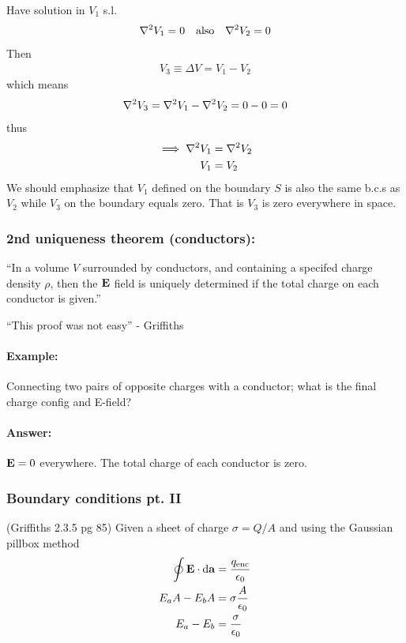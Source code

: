 \documentclass[../main.tex]{subfiles}
\begin{document}
Have solution in $V_1$ s.l.
\begin{align*}
    \laplacian V_1 = 0 \qqtext{also} \laplacian V_2 = 0
\end{align*}
Then
\begin{align*}
    V_3 \equiv \Delta V = V_1 - V_2
\end{align*}
which means
\begin{align*}
    \laplacian V_3 = \laplacian V_1 - \laplacian V_2 = 0 - 0 = 0
\end{align*}
thus
\begin{align*}
    \implies \laplacian V_1 &= \laplacian V_2 \\
    V_1 &= V_2
\end{align*}
We should emphasize that $V_1$ defined on the boundary $S$ is also the same b.c.s as $V_2$ while $V_3$ on the boundary equals zero.
That is $V_3$ is zero everywhere in space.

\subsubsection{2nd uniqueness theorem (conductors):}

``In a volume $V$ surrounded by conductors, and containing a specifed charge density $\rho$,
then the $\vb E$ field is uniquely determined if the total charge on each conductor is given.''

``This proof was not easy'' - Griffiths

\paragraph{Example:} Connecting two pairs of opposite charges with a conductor;
what is the final charge config and E-field?

\paragraph{Answer:} $\vb E = 0$ everywhere. The total charge of each conductor is zero.

\subsubsection{Boundary conditions pt. II}

(Griffiths 2.3.5 pg 85) Given a sheet of charge $\sigma = Q/ A$ and using the Gaussian pillbox method 
\begin{align*}
    \oint \vb E \cdot \dd\vb a &= \frac{q_\text{enc}}{\epsilon_0} \\
    E_a A - E_b A &= \sigma \frac{A}{\epsilon_0} \\
    E_a - E_b &= \frac{\sigma}{\epsilon_0}
\end{align*}
\end{document}
